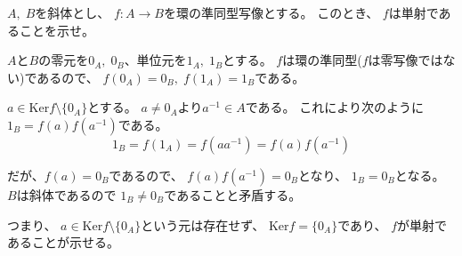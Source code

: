 \documentclass[12pt,b5paper]{ltjsarticle}
\begin{document}
\hrulefill

$A,\;B$を斜体とし、
$f:A\to B$を環の準同型写像とする。
このとき、
$f$は単射であることを示せ。

\dotfill

$A$と$B$の零元を$0_{A},\; 0_{B}$、単位元を$1_{A},\;1_{B}$とする。
$f$は環の準同型($f$は零写像ではない)であるので、
$f(0_{A})=0_{B} ,\; f(1_{A})=1_{B}$である。

$a \in \mathrm{Ker}f \setminus \{0_{A}\}$とする。
$a\ne 0_{A}$より$a^{-1}\in A$である。
これにより次のように
$1_{B} = f(a)f(a^{-1})$である。
\begin{equation}
 1_{B} = f(1_{A})
  = f(aa^{-1})
  = f(a)f(a^{-1})
\end{equation}

だが、$f(a)=0_{B}$であるので、
$f(a)f(a^{-1})=0_{B}$となり、
$1_{B} = 0_{B}$となる。
$B$は斜体であるので
$1_{B} \ne 0_{B}$であることと矛盾する。

つまり、
$a \in \mathrm{Ker}f \setminus \{0_{A}\}$という元は存在せず、
$\mathrm{Ker}f = \{0_{A}\}$であり、
$f$が単射であることが示せる。

\hrulefill
\end{document}

